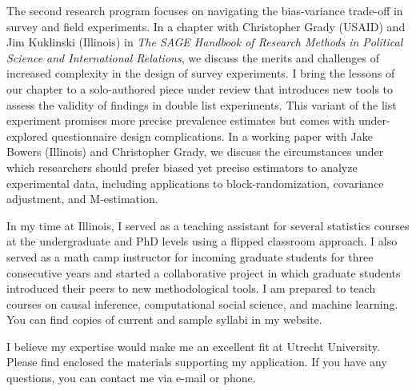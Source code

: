 \documentclass[
  11pt,
]{article}
\begin{document}
The second research program focuses on navigating the bias-variance
trade-off in survey and field experiments. In a chapter with Christopher
Grady (USAID) and Jim Kuklinski (Illinois) in \emph{The SAGE Handbook of
Research Methods in Political Science and International Relations}, we
discuss the merits and challenges of increased complexity in the design
of survey experiments. I bring the lessons of our chapter to a
solo-authored piece under review that introduces new tools to assess the
validity of findings in double list experiments. This variant of the
list experiment promises more precise prevalence estimates but comes
with under-explored questionnaire design complications. In a working
paper with Jake Bowers (Illinois) and Christopher Grady, we discuss the
circumstances under which researchers should prefer biased yet precise
estimators to analyze experimental data, including applications to
block-randomization, covariance adjustment, and M-estimation.

In my time at Illinois, I served as a teaching assistant for several
statistics courses at the undergraduate and PhD levels using a flipped
classroom approach. I also served as a math camp instructor for incoming
graduate students for three consecutive years and started a
collaborative project in which graduate students introduced their peers
to new methodological tools. I am prepared to teach courses on causal
inference, computational social science, and machine learning. You can
find copies of current and sample syllabi in my website.

I believe my expertise would make me an excellent fit at Utrecht
University. Please find enclosed the materials supporting my
application. If you have any questions, you can contact me via e-mail or
phone.
\end{document}
